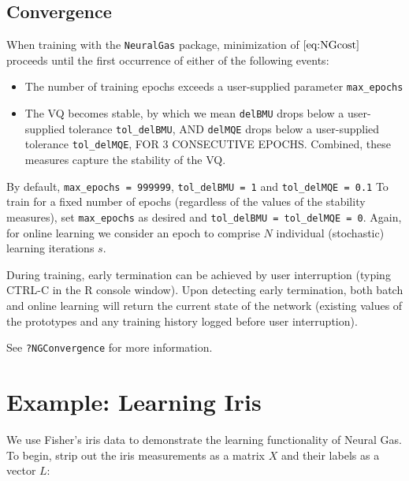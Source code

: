 \documentclass[11pt,]{article}
\providecommand{\tightlist}{%
\setlength{\itemsep}{0pt}\setlength{\parskip}{0pt}}
\begin{document}
\hypertarget{convergence}{%
\subsection{Convergence}\label{convergence}}

When training with the \texttt{NeuralGas} package, minimization of
\(\eqref{eq:NGcost}\) proceeds until the first occurrence of either of
the following events:

\begin{itemize}
\tightlist
\item
  The number of training epochs exceeds a user-supplied parameter
  \texttt{max\_epochs}
\item
  The VQ becomes stable, by which we mean \texttt{delBMU} drops below a
  user-supplied tolerance \texttt{tol\_delBMU}, AND \texttt{delMQE}
  drops below a user-supplied tolerance \texttt{tol\_delMQE}, FOR 3
  CONSECUTIVE EPOCHS. Combined, these measures capture the stability of
  the VQ.
\end{itemize}

By default, \texttt{max\_epochs\ =\ 999999}, \texttt{tol\_delBMU\ =\ 1}
and \texttt{tol\_delMQE\ =\ 0.1} To train for a fixed number of epochs
(regardless of the values of the stability measures), set
\texttt{max\_epochs} as desired and
\texttt{tol\_delBMU\ =\ tol\_delMQE\ =\ 0}. Again, for online learning
we consider an epoch to comprise \(N\) individual (stochastic) learning
iterations \(s\).

During training, early termination can be achieved by user interruption
(typing CTRL-C in the R console window). Upon detecting early
termination, both batch and online learning will return the current
state of the network (existing values of the prototypes and any training
history logged before user interruption).

See \texttt{?NGConvergence} for more information.

\hypertarget{example-learning-iris}{%
\section{Example: Learning Iris}\label{example-learning-iris}}

We use Fisher's iris data to demonstrate the learning functionality of
Neural Gas. To begin, strip out the iris measurements as a matrix \(X\)
and their labels as a vector \(L\):
\end{document}

